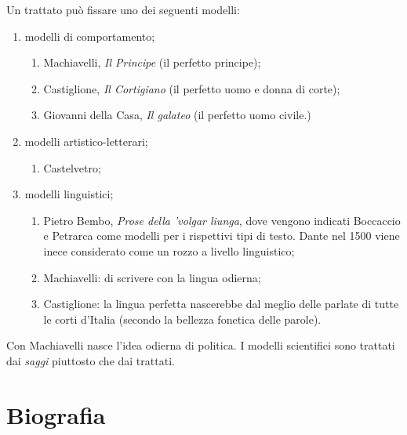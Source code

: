 \documentclass[a4paper]{article}
\begin{document}

Un trattato può fissare uno dei seguenti modelli:
\begin{enumerate}
    \item modelli di comportamento;
    \begin{enumerate}
        \item Machiavelli, \textit{Il Principe} (il perfetto principe);
        \item Castiglione, \textit{Il Cortigiano} (il perfetto uomo e donna di corte);
        \item Giovanni della Casa, \textit{Il galateo} (il perfetto uomo civile.)
    \end{enumerate}
    \item modelli artistico-letterari;
    \begin{enumerate}
        \item Castelvetro;
    \end{enumerate}
    \item modelli linguistici;
    \begin{enumerate}
        \item Pietro Bembo, \textit{Prose della 'volgar liunga},
            dove vengono indicati Boccaccio e Petrarca come modelli per i rispettivi tipi di testo.
            Dante nel 1500 viene inece considerato come un rozzo a livello linguistico;
        \item Machiavelli: di scrivere con la lingua odierna;
        \item Castiglione: la lingua perfetta nascerebbe dal
            meglio delle parlate di tutte le corti d'Italia (secondo la bellezza fonetica delle parole).
    \end{enumerate}
\end{enumerate}

Con Machiavelli nasce l'idea odierna di politica.
I modelli scientifici sono trattati dai \textit{saggi} piuttosto che dai trattati.

\pagebreak

\section{Biografia}
\end{document}
